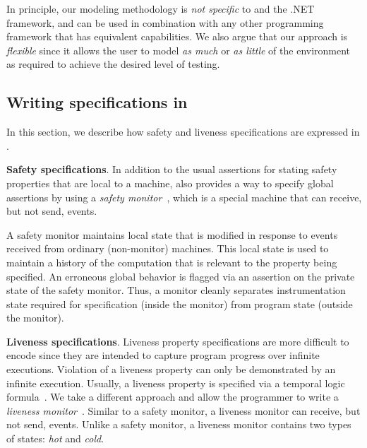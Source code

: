 In principle, our modeling methodology is \emph{not specific} to \psharp and the .NET framework, and can be used in combination with any other programming framework that has equivalent capabilities. We also argue that our approach is \emph{flexible} since it allows the user to model \emph{as much} or \emph{as little} of the environment as required to achieve the desired level of testing.

\subsection{Writing specifications in \psharp}
\label{sec:overview:bugs}

In  this section, we describe how safety and liveness specifications are expressed in \psharp.

\textbf{Safety specifications}.
In addition to the usual assertions for stating safety properties that are local to a machine, \psharp also provides a way to specify global assertions by using a \emph{safety monitor}~\cite{desai2015building}, which is a special machine that can receive, but not send, events.

A safety monitor maintains local state that is modified in response to events received from ordinary (non-monitor) machines. This local state is used to maintain a history of the computation that is relevant to the property being specified. An erroneous global behavior is flagged via an assertion on the private state of the safety monitor. Thus, a \psharp monitor cleanly separates instrumentation state required for specification (inside the monitor) from program state (outside the monitor).

\textbf{Liveness specifications}.
Liveness property specifications are more difficult to encode since they are intended to capture program progress over infinite executions. Violation of a liveness property can only be demonstrated by an infinite execution. Usually, a liveness property is specified via a temporal logic formula~\cite{Pnueli1977,lamport1994temporal}. We take a different approach and allow the programmer to write a \emph{liveness monitor}~\cite{desai2015building}. Similar to a safety monitor, a liveness monitor can receive, but not send, events. Unlike a safety monitor, a liveness monitor contains two types of states: \emph{hot} and \emph{cold}.

